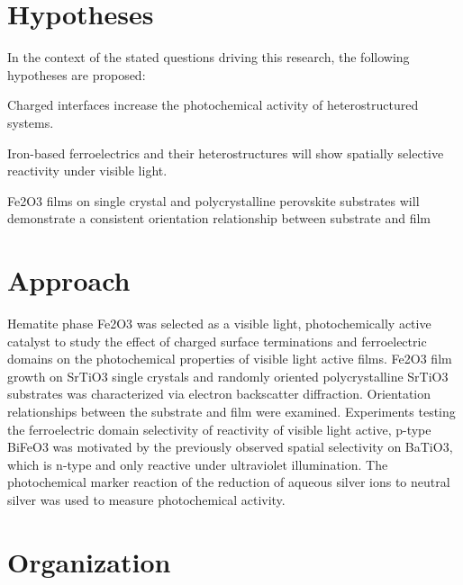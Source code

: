 \documentclass[12pt,%
              twoside,
               letterpaper]{uiothesis}
\begin{document}
\section{Hypotheses}\label{sec:intro.hypotheses}
In the context of the stated questions driving this research, the following hypotheses are
proposed:

\begin{items}
	\item Charged interfaces increase the photochemical activity of heterostructured
systems.
	\item Iron-based ferroelectrics and their heterostructures will show spatially
selective reactivity under visible light.
	\item Fe2O3 films on  single crystal and polycrystalline perovskite substrates
will demonstrate a consistent orientation relationship between substrate and film
\end{items}

\section{Approach}
\label{sec:intro.approach}

Hematite phase Fe2O3 was selected as a visible light, photochemically active catalyst
to study the effect of charged surface terminations and ferroelectric domains on the
photochemical properties of visible light active films. Fe2O3 film growth on
SrTiO3 single crystals and randomly oriented polycrystalline SrTiO3 substrates
was characterized via electron backscatter diffraction. Orientation relationships between
the substrate and film were examined. Experiments testing the ferroelectric domain
selectivity of reactivity of visible light active, p-type BiFeO3 was motivated by the
previously observed spatial selectivity on BaTiO3, which is n-type and only reactive
under ultraviolet illumination. The photochemical marker reaction of the reduction of
aqueous silver ions to neutral silver was used to measure photochemical activity.

\section{Organization}
\label{sec:intro.organization}
\end{document}
